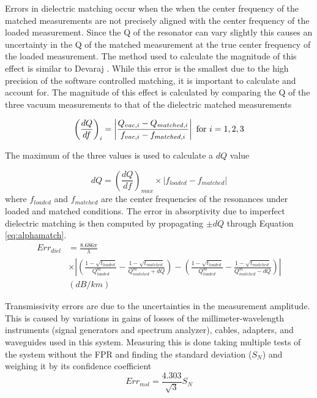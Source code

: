 Errors in dielectric matching occur when the when the center frequency of the matched measurements are not precisely aligned with the center frequency of the loaded measurement. Since the Q of the resonator can vary slightly this causes an uncertainty in the Q of the matched measurement at the true center frequency of the loaded measurement. The method used to calculate the magnitude of this effect is similar to Devaraj \cite{Devaraj-thesis}. While this error is the smallest due to the high precision of the software controlled matching, it is important to calculate and account for. The magnitude of this effect is calculated by comparing the Q of the three vacuum measurements to that of the dielectric matched measurements

\begin{equation}
\left(\frac{dQ}{df} \right)_i = \left|\frac{Q_{vac,i} - Q_{matched,i}}{f_{vac,i} - f_{matched,i}} \right| \textnormal{ for } i = 1,2,3
\end{equation}

The maximum of the three values is used to calculate a $dQ$ value

\begin{equation}
dQ = \left(\frac{dQ}{df} \right)_{max} \times |f_{loaded} - f_{matched}|
\end{equation}
where $f_{loaded}$ and $ f_{matched}$ are the center frequencies of the resonances under loaded and matched conditions. The error in absorptivity due to imperfect dielectric matching is then computed by propagating $\pm dQ$ through Equation \ref{eq:alphamatch}.
\begin{equation}
\begin{split}
Err_{diel} &= \frac{8.686 \pi}{\lambda} 
\\ &\times \left| \left( \frac{1-\sqrt{t_{loaded}}}{Q^m_{loaded}} - \frac{1-\sqrt{t_{matched}}}{Q^m_{matched} + dQ} \right) - \left( \frac{1-\sqrt{t_{loaded}}}{Q^m_{loaded}} - \frac{1-\sqrt{t_{matched}}}{Q^m_{matched} - dQ} \right) \right|\\
 &(dB/km)
\end{split}
\end{equation}

Transmissivity errors are due to the uncertainties in the measurement amplitude. This is caused by variations in gains of losses of the millimeter-wavelength instruments (signal generators and spectrum analyzer), cables, adapters, and waveguides used in this system. Measuring this is done taking multiple tests of the system without the FPR and finding the standard deviation ($S_N$) and weighing it by its confidence coefficient
\begin{equation}
Err_{msl} = \frac{4.303}{\sqrt{3}}S_N
\end{equation}


